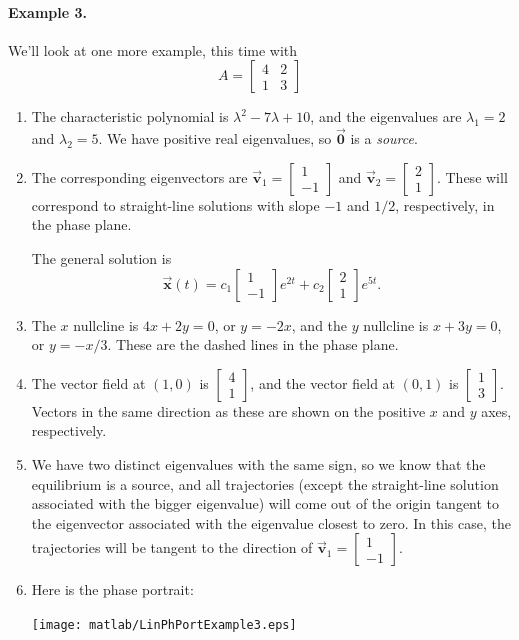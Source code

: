 \documentclass{book}
\newcommand{\BV}{\vec{\textbf{v}}}
\newcommand{\BX}{\vec{\textbf{x}}}
\newcommand{\BZ}{\vec{\textbf{0}}}  %
\begin{document}
\paragraph{Example 3.}
We'll look at one more example, this time with
\[
   A = \begin{bmatrix}
            4 & 2 \\ 1 & 3
       \end{bmatrix}
\]
\begin{enumerate}
\item
The characteristic polynomial is
$\lambda^2 -7\lambda +10$, and the eigenvalues are
$\lambda_1 = 2$ and $\lambda_2 = 5$.
We have positive real eigenvalues, so
$\BZ$ is a \emph{source}.
\item
The corresponding eigenvectors are
$\BV_1 = \begin{bmatrix} 1 \\ -1 \end{bmatrix}$
and
$\BV_2 = \begin{bmatrix} 2 \\ 1 \end{bmatrix}$.
These will correspond to straight-line solutions with
slope $-1$ and $1/2$, respectively, in the phase plane.

The general solution is
\begin{equation}
\BX(t) = c_1 \begin{bmatrix} 1 \\ -1 \end{bmatrix} e^{2t}
   + c_2 \begin{bmatrix} 2 \\ 1 \end{bmatrix} e^{5t}.
\end{equation}
\item
The $x$ nullcline is $4x+2y=0$, or $y = -2x$, and the
$y$ nullcline is $x+3y=0$, or $y=-x/3$.  These are the
dashed lines in the phase plane.
\item
The vector field at $(1,0)$ is $\begin{bmatrix} 4 \\ 1 \end{bmatrix}$,
and the vector field at $(0,1)$
is $\begin{bmatrix} 1 \\ 3 \end{bmatrix}$.  Vectors in the
same direction as these are shown on the positive $x$ and $y$ axes,
respectively.
\item We have two distinct eigenvalues with the same sign, so
we know that the equilibrium is a source, and all trajectories
(except the straight-line solution associated with the
bigger eigenvalue) will come out of the origin
tangent to the eigenvector associated with the eigenvalue
closest to zero.  In this case, the trajectories will
be tangent to the direction of
$\BV_1 = \begin{bmatrix}1 \\ -1 \end{bmatrix}$.
\item
Here is the phase portrait:

\noindent
\centerline{\texttt{[image: matlab/LinPhPortExample3.eps]}}
\end{enumerate}
%
%
%
\end{document}

